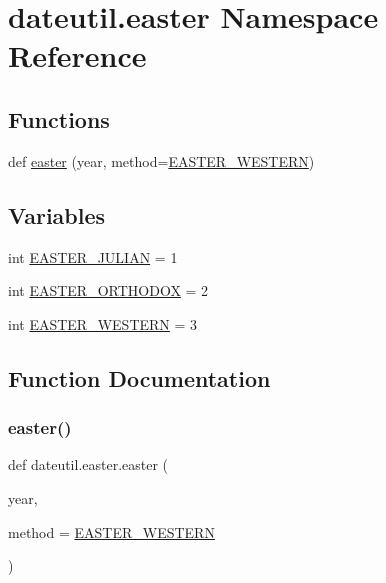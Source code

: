 \hypertarget{namespacedateutil_1_1easter}{}\section{dateutil.\+easter Namespace Reference}
\label{namespacedateutil_1_1easter}
\subsection*{Functions}
\begin{DoxyCompactItemize}
\item 
def \hyperlink{namespacedateutil_1_1easter_a4b7d108a3e023afeea1b274f3ef33eae}{easter} (year, method=\hyperlink{namespacedateutil_1_1easter_a4ac5ff01646101652b7f14cb8ea9efe1}{E\+A\+S\+T\+E\+R\+\_\+\+W\+E\+S\+T\+E\+RN})
\end{DoxyCompactItemize}
\subsection*{Variables}
\begin{DoxyCompactItemize}
\item 
int \hyperlink{namespacedateutil_1_1easter_a0f48635544f76e1371844ecbc5761a96}{E\+A\+S\+T\+E\+R\+\_\+\+J\+U\+L\+I\+AN} = 1
\item 
int \hyperlink{namespacedateutil_1_1easter_af476c86174fc92d91cdbc970e073d5b6}{E\+A\+S\+T\+E\+R\+\_\+\+O\+R\+T\+H\+O\+D\+OX} = 2
\item 
int \hyperlink{namespacedateutil_1_1easter_a4ac5ff01646101652b7f14cb8ea9efe1}{E\+A\+S\+T\+E\+R\+\_\+\+W\+E\+S\+T\+E\+RN} = 3
\end{DoxyCompactItemize}


\subsection{Function Documentation}
\mbox{\label{namespacedateutil_1_1easter_a4b7d108a3e023afeea1b274f3ef33eae}} 
\subsubsection{\texorpdfstring{easter()}{easter()}}
{\footnotesize\ttfamily def dateutil.\+easter.\+easter (\begin{DoxyParamCaption}\item[{}]{year,  }\item[{}]{method = {\ttfamily \hyperlink{namespacedateutil_1_1easter_a4ac5ff01646101652b7f14cb8ea9efe1}{E\+A\+S\+T\+E\+R\+\_\+\+W\+E\+S\+T\+E\+RN}} }\end{DoxyParamCaption})}

